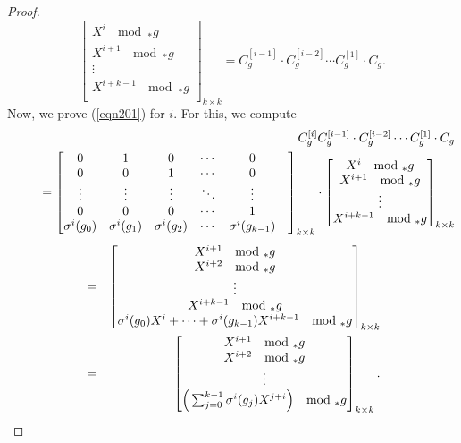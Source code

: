 \documentclass[11pt]{article}
\begin{document}
\begin{proof}
	$$\begin{bmatrix}\label{eqn5.8}
		X^i ~ \mod _*g  \\
		X^{i+1} ~ \mod _*g  \\
		\vdots\\
		X^{i+k-1} ~ \mod _*g  \\
	\end{bmatrix}_{k\times k}=
	C_g^{[i-1]}\cdot C_g^{[i-2]}\cdots C_g^{[1]}\cdot C_g.$$
	Now, we prove (\ref{eqn201}) for $i$. For this, we compute 
    \begin{eqnarray*}
        \notag&~&C^{[i]}_g C_g^{[i-1]}\cdot C_g^{[i-2]}\cdots C_g^{[1]}\cdot C_g\\
		\notag&~~~~~&	=\begin{bmatrix}
			0&1&0&\cdots&0\\
			0&0&1&\cdots&0\\
			\vdots&\vdots&\vdots&\ddots&\vdots&\\
			0&0&0&\cdots&1\\
			\sigma^{i}(g_0)&\sigma^{i}(g_1)&\sigma^{i}(g_2)&\cdots&\sigma^{i}(g_{k-1})
		\end{bmatrix}_{k\times k} \cdot \begin{bmatrix}
			X^i ~ \mod _*g  \\
			X^{i+1} ~ \mod _*g \\
			\vdots\\
			X^{i+k-1} ~ \mod _*g \\
		\end{bmatrix}_{k\times k}\\
    \end{eqnarray*}
	\begin{eqnarray}\label{eqn11}
		\notag&=&\begin{bmatrix}
			X^{i+1}~ \mod _*g  \\
			X^{i+2}~ \mod _*g  \\
			\vdots\\
			X^{i+k-1}~\mod_*g\\
            \sigma^{i}(g_0)X^i+\cdots+\sigma^{i}(g_{k-1})X^{i+k-1}~ \mod _*g  
		\end{bmatrix}_{k\times k}\\
		&=&\begin{bmatrix}
			X^{i+1}~ \mod _*g \\
			X^{i+2}~ \mod _*g  \\
			\vdots\\
			\Big(\sum_{j=0}^{k-1}\sigma^{i}(g_j)X^{j+i}\Big)~ \mod _*g  \\
		\end{bmatrix}_{k\times k}.
	\end{eqnarray}
	\normalsize
    

\end{proof}
\end{document}

